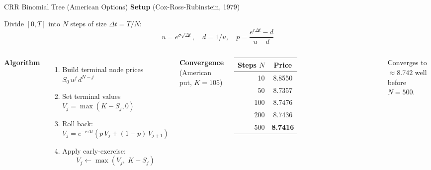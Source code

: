 \documentclass[aspectratio=169,10pt]{beamer}
\begin{document}
\begin{frame}{CRR Binomial Tree (American Options)}
  \textbf{Setup} (Cox-Ross-Rubinstein, 1979)

  Divide $[0,T]$ into $N$ steps of size $\Delta t = T/N$:
  \[
    u = e^{\sigma\sqrt{\Delta t}},\quad d = 1/u,\quad
    p = \frac{e^{r\Delta t} - d}{u - d}
  \]

  \begin{columns}[T]
      \textbf{Algorithm}
      \begin{enumerate}
        \item Build terminal node prices $S_0\,u^j\,d^{N-j}$
        \item Set terminal values $V_j = \max(K - S_j, 0)$
        \item Roll back:
              \[
                V_j = e^{-r\Delta t}(p\,V_j + (1-p)\,V_{j+1})
              \]
        \item Apply early-exercise:
              \[
                V_j \leftarrow \max(V_j,\; K - S_j)
              \]
      \end{enumerate}

      \textbf{Convergence} (American put, $K=105$)

      \medskip
      \begin{tabular}{rc}
        \toprule
        Steps $N$ & Price \\
        \midrule
        10  & 8.8550 \\
        50  & 8.7357 \\
        100 & 8.7476 \\
        200 & 8.7436 \\
        500 & \textbf{8.7416} \\
        \bottomrule
      \end{tabular}

      \medskip
      \footnotesize Converges to $\approx8.742$ well before $N=500$.
  \end{columns}
\end{frame}
\end{document}
